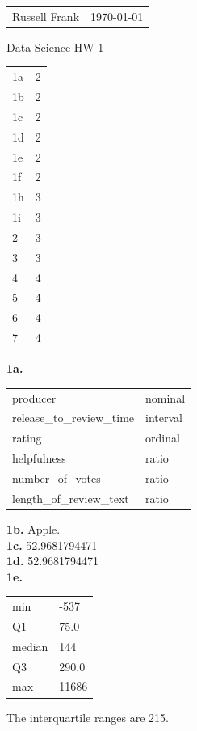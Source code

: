 \documentclass[10pt]{amsart}
\makeatletter
\newcommand{\head}[1]{
   \begin{tabular*}{7.1in}{@{}l@{\extracolsep{\fill}}r}
      Russell Frank & \today \\
   \end{tabular*}
   \begin{center} \LARGE #1 \normalsize \end{center}
   \vskip 0.1in
}
\def\wl{\par \vspace{\baselineskip}}
\makeatother
\begin{document}
\head{Data Science HW 1}

\begin{tabular}{l|l}
  1a & 2 \\
  1b & 2 \\
  1c & 2 \\
  1d & 2 \\
  1e & 2 \\
  1f & 2 \\
  1h & 3 \\
  1i & 3 \\
  2 & 3 \\
  3 & 3 \\
  4 & 4 \\
  5 & 4 \\
  6 & 4 \\
  7 & 4 \\
\end{tabular}

\newpage

\textbf{1a.}

\begin{tabular}{ll}
  producer & nominal \\
  release\_to\_review\_time & interval \\
  rating & ordinal \\
  helpfulness & ratio \\
  number\_of\_votes & ratio \\
  length\_of\_review\_text & ratio \\
\end{tabular}

\textbf{1b.} Apple. \\

\textbf{1c.} 52.9681794471 \\

\textbf{1d.} 52.9681794471 \\

\textbf{1e.} 

\begin{tabular}{ll}
  min & -537 \\
  Q1 & 75.0 \\
  median & 144 \\
  Q3 & 290.0 \\
  max & 11686 \\
\end{tabular}

\wl

The interquartile ranges are 215. \\
\end{document}
